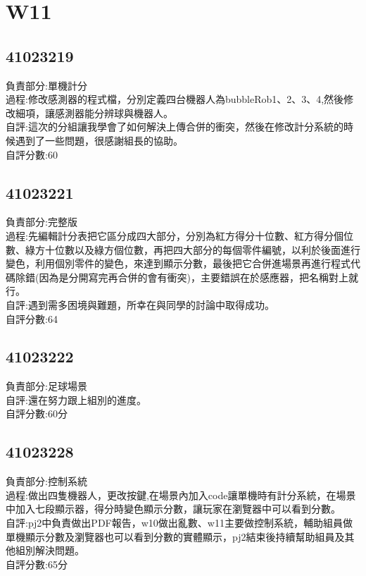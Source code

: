 \chapter{W11}


\section{41023219}

負責部分:單機計分\\過程:修改感測器的程式檔，分別定義四台機器人為bubbleRob1、2、3、4,然後修改細項，讓感測器能分辨球與機器人。\\自評:這次的分組讓我學會了如何解決上傳合併的衝突，然後在修改計分系統的時候遇到了一些問題，很感謝組長的協助。\\自評分數:60


\section{41023221}

負責部分:完整版\\過程:先編輯計分表把它區分成四大部分，分別為紅方得分十位數、紅方得分個位數、綠方十位數以及綠方個位數，再把四大部分的每個零件編號，以利於後面進行變色，利用個別零件的變色，來達到顯示分數，最後把它合併進場景再進行程式代碼除錯(因為是分開寫完再合併的會有衝突)，主要錯誤在於感應器，把名稱對上就行。\\自評:遇到需多困境與難題，所幸在與同學的討論中取得成功。\\自評分數:64

\section{41023222}

負責部分:足球場景\\自評:還在努力跟上組別的進度。\\自評分數:60分


\section{41023228}

負責部分:控制系統\\過程:做出四隻機器人，更改按鍵,在場景內加入code讓單機時有計分系統，在場景中加入七段顯示器，得分時變色顯示分數，讓玩家在瀏覽器中可以看到分數。\\自評:pj2中負責做出PDF報告，w10做出亂數、w11主要做控制系統，輔助組員做單機顯示分數及瀏覽器也可以看到分數的實體顯示，pj2結束後持續幫助組員及其他組別解決問題。\\自評分數:65分